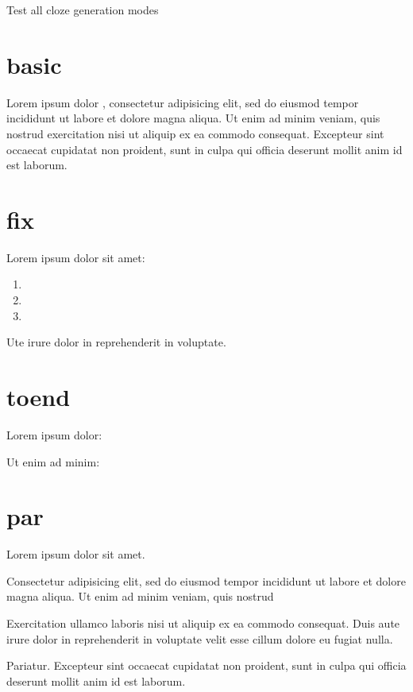 \documentclass{article}
\begin{document}
{Test all cloze generation modes}

\section{basic}

Lorem ipsum dolor , consectetur adipisicing elit, sed do
eiusmod tempor incididunt ut labore et dolore magna aliqua. Ut enim ad
minim veniam, quis nostrud exercitation  nisi ut
aliquip ex ea commodo consequat.  Excepteur sint occaecat cupidatat non proident, sunt in culpa
qui officia deserunt mollit anim id est laborum.

\section{fix}

Lorem ipsum dolor sit amet:

\begin{enumerate}
\item {}
\item {}
\item {}
\end{enumerate}

Ute irure dolor in reprehenderit in voluptate.

\section{toend}

Lorem ipsum dolor: 

Ut enim ad minim: 

\section{par}

\begin{clozepar}
Lorem ipsum dolor sit amet.
\end{clozepar}

Consectetur adipisicing elit, sed do eiusmod tempor incididunt ut labore
et dolore magna aliqua. Ut enim ad minim veniam, quis nostrud

\begin{clozepar}
Exercitation ullamco laboris nisi ut aliquip ex ea commodo consequat.
Duis aute irure dolor in reprehenderit in voluptate velit esse cillum
dolore eu fugiat nulla.
\end{clozepar}

Pariatur. Excepteur sint
occaecat cupidatat non proident, sunt in culpa qui officia deserunt
mollit anim id est laborum.
\end{document}
